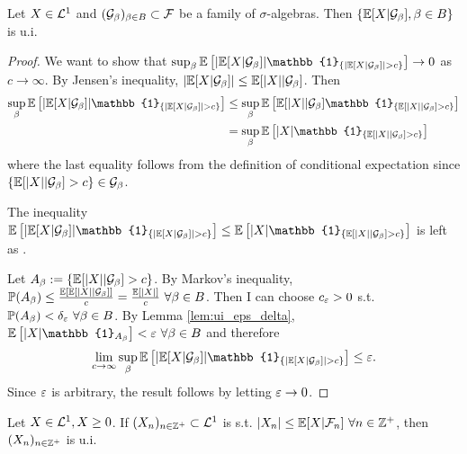 \begin{lemma} \label{lem:cond_exp_ui}
    Let $X \in \mathcal{L}^1$ and $(\mathcal{G}_\beta)_{\beta \in B} \subset \mathcal{F}$ be a family of $\sigma$-algebras. Then $\{ \mathbb E[X | \mathcal{G}_\beta], \beta \in B \}$ is u.i.
\end{lemma}

\begin{proof}
    We want to show that $\sup_\beta \EE \left[ |\EE[X | \mc{G}_\beta]| \mathbb{1}_{\{|\EE[X | \mc{G}_\beta]| > c\}} \right] \to 0$ as $c \to \infty$.
    By Jensen's inequality, $|\mathbb E[X | \mathcal{G}_\beta]| \leq \mathbb E[|X| | \mathcal{G}_\beta]$.
    Then
    \begin{align*}
        \sup_\beta \EE \left[ |\EE[X | \mc{G}_\beta]| \mathbb{1}_{\{|\EE[X | \mc{G}_\beta]| > c\}} \right] &\leq \sup_\beta \EE \left[ \EE[|X| | \mc{G}_\beta] \mathbb{1}_{\{\EE[|X| | \mc{G}_\beta] > c\}} \right] \\
        &= \sup_\beta \EE \left[ |X| \mathbb{1}_{\{\EE[|X| | \mc{G}_\beta] > c\}} \right]
    \end{align*}
    where the last equality follows from the definition of conditional expectation since $\{\mathbb E[|X| | \mathcal{G}_\beta] > c\} \in \mathcal{G}_\beta$.
    
    \begin{remark}
        The inequality $\EE \left[ |\EE[X | \mc{G}_\beta]| \mathbb{1}_{\{|\EE[X | \mc{G}_\beta]| > c\}} \right] \leq \EE \left[ |X| \mathbb{1}_{\{\EE[|X| | \mc{G}_\beta] > c\}} \right]$ is left as .
    \end{remark}

    Let $A_\beta := \{ \mathbb E[|X| | \mathcal{G}_\beta] > c \}$. By Markov's inequality, $\mathbb P(A_\beta) \leq \frac{\mathbb E[\mathbb E[|X| | \mathcal{G}_\beta]]}{c} = \frac{\mathbb E[|X|]}{c} \ \forall \beta \in B$.
    Then I can choose $c_\varepsilon > 0$ s.t. $\mathbb P(A_\beta) < \delta_\varepsilon \ \forall \beta \in B$.
    By Lemma \ref{lem:ui_eps_delta}, $\EE \left[ |X| \mathbb{1}_{A_\beta} \right] < \eps \ \forall \beta \in B$ and therefore
    \[ \lim_{c \to \infty} \sup_\beta \EE \left[ |\EE[X | \mc{G}_\beta]| \mathbb{1}_{\{|\EE[X | \mc{G}_\beta]| > c\}} \right] \leq \eps. \]
    Since $\varepsilon$ is arbitrary, the result follows by letting $\varepsilon \to 0$.
\end{proof}

\begin{lemma}
    Let $X \in \mathcal{L}^1, X \geq 0$. If $(X_n)_{n \in \mathbb Z^+} \subset \mathcal{L}^1$ is s.t. $|X_n| \leq \EE[X | \mc{F}_n] \ \forall n \in \ZZ^+$, then $(X_n)_{n \in \mathbb Z^+}$ is u.i.
\end{lemma}

